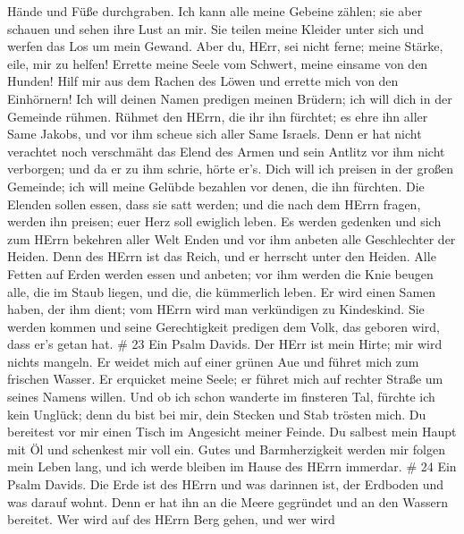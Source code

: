 Hände und Füße durchgraben.  Ich kann alle meine Gebeine
zählen; sie aber schauen und sehen ihre Lust an mir.  Sie
teilen meine Kleider unter sich und werfen das Los um mein Gewand.
 Aber du, HErr, sei nicht ferne; meine Stärke, eile, mir zu
helfen!  Errette meine Seele vom Schwert, meine einsame von
den Hunden!  Hilf mir aus dem Rachen des Löwen und errette
mich von den Einhörnern!  Ich will deinen Namen predigen
meinen Brüdern; ich will dich in der Gemeinde rühmen. 
Rühmet den HErrn, die ihr ihn fürchtet; es ehre ihn aller Same Jakobs,
und vor ihm scheue sich aller Same Israels.  Denn er hat
nicht verachtet noch verschmäht das Elend des Armen und sein Antlitz vor
ihm nicht verborgen; und da er zu ihm schrie, hörte er's. 
Dich will ich preisen in der großen Gemeinde; ich will meine Gelübde
bezahlen vor denen, die ihn fürchten.  Die Elenden sollen
essen, dass sie satt werden; und die nach dem HErrn fragen, werden ihn
preisen; euer Herz soll ewiglich leben.  Es werden gedenken
und sich zum HErrn bekehren aller Welt Enden und vor ihm anbeten alle
Geschlechter der Heiden.  Denn des HErrn ist das Reich, und
er herrscht unter den Heiden.  Alle Fetten auf Erden werden
essen und anbeten; vor ihm werden die Knie beugen alle, die im Staub
liegen, und die, die kümmerlich leben.  Er wird einen Samen
haben, der ihm dient; vom HErrn wird man verkündigen zu Kindeskind.
 Sie werden kommen und seine Gerechtigkeit predigen dem
Volk, das geboren wird, dass er's getan hat. \# 23  Ein
Psalm Davids. Der HErr ist mein Hirte; mir wird nichts mangeln.
 Er weidet mich auf einer grünen Aue und führet mich zum
frischen Wasser.  Er erquicket meine Seele; er führet mich
auf rechter Straße um seines Namens willen.  Und ob ich
schon wanderte im finsteren Tal, fürchte ich kein Unglück; denn du bist
bei mir, dein Stecken und Stab trösten mich.  Du bereitest
vor mir einen Tisch im Angesicht meiner Feinde. Du salbest mein Haupt
mit Öl und schenkest mir voll ein.  Gutes und Barmherzigkeit
werden mir folgen mein Leben lang, und ich werde bleiben im Hause des
HErrn immerdar. \# 24  Ein Psalm Davids. Die Erde ist des
HErrn und was darinnen ist, der Erdboden und was darauf wohnt.
 Denn er hat ihn an die Meere gegründet und an den Wassern
bereitet.  Wer wird auf des HErrn Berg gehen, und wer wird
